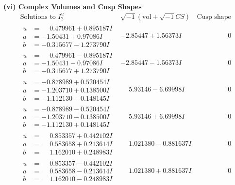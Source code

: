 \documentclass[1p]{elsarticle_modified}
\theoremstyle{definition}
\newcommand{\I}{\sqrt{-1}}
\begin{document}
\newpage\flushleft \textbf{(vi) Complex Volumes and Cusp Shapes}
$$\begin{array}{c|c|c}  
\text{Solutions to }I^u_{2}& \I (\text{vol} + \sqrt{-1}CS) & \text{Cusp shape}\\
 \hline 
\begin{aligned}
u &= \phantom{-}0.479961 + 0.895187 I \\
a &= -1.50431 + 0.97086 I \\
b &= -0.315677 - 1.273790 I\end{aligned}
 & -2.85447 + 1.56373 I & \phantom{-0.000000 } 0 \\ \hline\begin{aligned}
u &= \phantom{-}0.479961 - 0.895187 I \\
a &= -1.50431 - 0.97086 I \\
b &= -0.315677 + 1.273790 I\end{aligned}
 & -2.85447 - 1.56373 I & \phantom{-0.000000 } 0 \\ \hline\begin{aligned}
u &= -0.878989 + 0.520454 I \\
a &= -1.203710 + 0.138500 I \\
b &= -1.112130 - 0.148145 I\end{aligned}
 & \phantom{-}5.93146 - 6.69998 I & \phantom{-0.000000 } 0 \\ \hline\begin{aligned}
u &= -0.878989 - 0.520454 I \\
a &= -1.203710 - 0.138500 I \\
b &= -1.112130 + 0.148145 I\end{aligned}
 & \phantom{-}5.93146 + 6.69998 I & \phantom{-0.000000 } 0 \\ \hline\begin{aligned}
u &= \phantom{-}0.853357 + 0.442102 I \\
a &= \phantom{-}0.583658 + 0.213614 I \\
b &= \phantom{-}1.162010 + 0.248983 I\end{aligned}
 & \phantom{-}1.021380 - 0.881637 I & \phantom{-0.000000 } 0 \\ \hline\begin{aligned}
u &= \phantom{-}0.853357 - 0.442102 I \\
a &= \phantom{-}0.583658 - 0.213614 I \\
b &= \phantom{-}1.162010 - 0.248983 I\end{aligned}
 & \phantom{-}1.021380 + 0.881637 I & \phantom{-0.000000 } 0 \\ \hline\begin{aligned}

\end{aligned}
\end{array}$$
\end{document}
